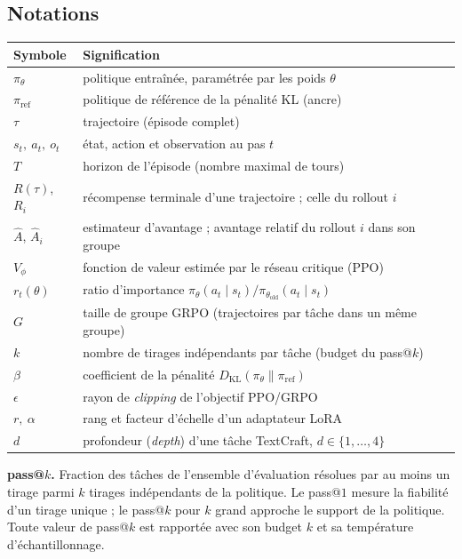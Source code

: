 \documentclass[11pt,a4paper]{article}
\begin{document}
\subsection*{Notations}
\begin{tabular}{ll}
\toprule
Symbole & Signification \\
\midrule
$\pi_\theta$ & politique entraînée, paramétrée par les poids $\theta$ \\
$\pi_{\text{ref}}$ & politique de référence de la pénalité KL (ancre) \\
$\tau$ & trajectoire (épisode complet) \\
$s_t,\ a_t,\ o_t$ & état, action et observation au pas $t$ \\
$T$ & horizon de l'épisode (nombre maximal de tours) \\
$R(\tau)$, $R_i$ & récompense terminale d'une trajectoire ; celle du rollout $i$ \\
$\hat{A}$, $\hat{A}_i$ & estimateur d'avantage ; avantage relatif du rollout $i$ dans son groupe \\
$V_\phi$ & fonction de valeur estimée par le réseau critique (PPO) \\
$r_t(\theta)$ & ratio d'importance $\pi_\theta(a_t \mid s_t)/\pi_{\theta_{\text{old}}}(a_t \mid s_t)$ \\
$G$ & taille de groupe GRPO (trajectoires par tâche dans un même groupe) \\
$k$ & nombre de tirages indépendants par tâche (budget du pass@$k$) \\
$\beta$ & coefficient de la pénalité $D_{\text{KL}}(\pi_\theta \parallel \pi_{\text{ref}})$ \\
$\epsilon$ & rayon de \emph{clipping} de l'objectif PPO/GRPO \\
$r,\ \alpha$ & rang et facteur d'échelle d'un adaptateur LoRA \\
$d$ & profondeur (\emph{depth}) d'une tâche TextCraft, $d \in \{1,\dots,4\}$ \\


\bottomrule
\end{tabular}

\medskip
\noindent\textbf{pass@$k$.} Fraction des tâches de l'ensemble d'évaluation résolues par
au moins un tirage parmi $k$ tirages indépendants de la politique. Le pass@$1$
mesure la fiabilité d'un tirage unique ; le pass@$k$ pour $k$ grand approche le
support de la politique. Toute valeur de pass@$k$ est rapportée avec son budget
$k$ et sa température d'échantillonnage.
\end{document}
